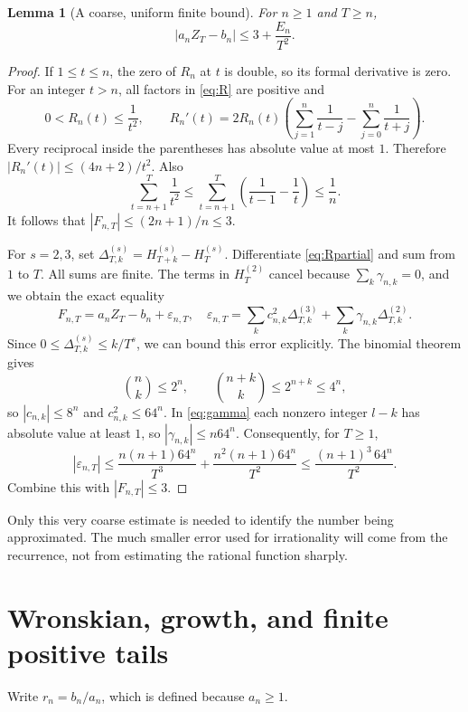 \documentclass[11pt]{article}
\newtheorem{lemma}[theorem]{Lemma}
\theoremstyle{definition}\newtheorem{definition}[theorem]{Definition}
\theoremstyle{remark}\newtheorem{remark}[theorem]{Remark}
\newcommand{\abs}[1]{\left|#1\right|}\newcommand{\floor}[1]{\left\lfloor#1\right\rfloor}
\newcommand{\HH}[2]{H_{#1}^{(#2)}}
\begin{document}
\begin{lemma}[A coarse, uniform finite bound]\label{lem:coarse}
For $n\ge1$ and $T\ge n$,
\begin{equation}\label{eq:coarse}
 \abs{a_nZ_T-b_n}\le3+\frac{E_n}{T^2}.
\end{equation}
\end{lemma}
\begin{proof}
If $1\le t\le n$, the zero of $R_n$ at $t$ is double, so its formal
derivative is zero. For an integer $t>n$, all factors in \eqref{eq:R} are
positive and
\[
 0<R_n(t)\le\frac1{t^2},\qquad
 R_n'(t)=2R_n(t)\left(
       \sum_{j=1}^{n}\frac1{t-j}-\sum_{j=0}^{n}\frac1{t+j}\right).
\]
Every reciprocal inside the parentheses has absolute value at most $1$.
Therefore $\abs{R_n'(t)}\le(4n+2)/t^2$. Also
\[
 \sum_{t=n+1}^{T}\frac1{t^2}
 \le\sum_{t=n+1}^{T}\left(\frac1{t-1}-\frac1t\right)\le\frac1n.
\]
It follows that $\abs{F_{n,T}}\le(2n+1)/n\le3$.

For $s=2,3$, set
$\Delta_{T,k}^{(s)}=\HH{T+k}{s}-\HH{T}{s}$.
Differentiate \eqref{eq:Rpartial} and sum from $1$ to $T$.
All sums are finite. The terms in $\HH{T}{2}$ cancel because
$\sum_k\gamma_{n,k}=0$, and we obtain the exact equality
\begin{equation}\label{eq:finite-pf}
 F_{n,T}=a_nZ_T-b_n+\varepsilon_{n,T},\quad
 \varepsilon_{n,T}=\sum_kc_{n,k}^2\Delta_{T,k}^{(3)}
                       +\sum_k\gamma_{n,k}\Delta_{T,k}^{(2)}.
\end{equation}
Since $0\le\Delta_{T,k}^{(s)}\le k/T^s$, we can bound this error explicitly.
The binomial theorem gives
\[
 \binom nk\le2^n,\qquad \binom{n+k}{k}\le2^{n+k}\le4^n,
\]
so $\abs{c_{n,k}}\le8^n$ and $c_{n,k}^2\le64^n$.
In \eqref{eq:gamma} each nonzero integer $l-k$ has absolute value at least
$1$, so $\abs{\gamma_{n,k}}\le n64^n$. Consequently, for $T\ge1$,
\[
 \abs{\varepsilon_{n,T}}
 \le\frac{n(n+1)64^n}{T^3}+\frac{n^2(n+1)64^n}{T^2}
 \le\frac{(n+1)^3\,64^n}{T^2}.
\]
Combine this with $\abs{F_{n,T}}\le3$.
\end{proof}

Only this very coarse estimate is needed to identify the number being
approximated. The much smaller error used for irrationality will come from
the recurrence, not from estimating the rational function sharply.

\section{Wronskian, growth, and finite positive tails}\label{sec:wronskian}
Write $r_n=b_n/a_n$, which is defined because $a_n\ge1$.
\end{document}
